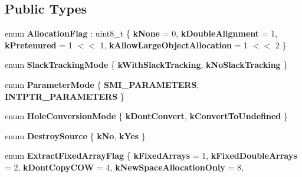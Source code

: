 \subsection*{Public Types}
\begin{DoxyCompactItemize}
\item 
\mbox{\label{classv8_1_1internal_1_1CodeStubAssembler_ae0f494c1a999736b5872756bb674ca27}} 
enum {\bfseries Allocation\+Flag} \+: uint8\+\_\+t \{ {\bfseries k\+None} = 0, 
{\bfseries k\+Double\+Alignment} = 1, 
{\bfseries k\+Pretenured} = 1 $<$$<$ 1, 
{\bfseries k\+Allow\+Large\+Object\+Allocation} = 1 $<$$<$ 2
 \}
\item 
\mbox{\label{classv8_1_1internal_1_1CodeStubAssembler_a9ce2b792c40dc56acca083b259c5ebb3}} 
enum {\bfseries Slack\+Tracking\+Mode} \{ {\bfseries k\+With\+Slack\+Tracking}, 
{\bfseries k\+No\+Slack\+Tracking}
 \}
\item 
\mbox{\label{classv8_1_1internal_1_1CodeStubAssembler_a9e5ad1c566cda424a1313af35b30e5da}} 
enum {\bfseries Parameter\+Mode} \{ {\bfseries S\+M\+I\+\_\+\+P\+A\+R\+A\+M\+E\+T\+E\+RS}, 
{\bfseries I\+N\+T\+P\+T\+R\+\_\+\+P\+A\+R\+A\+M\+E\+T\+E\+RS}
 \}
\item 
\mbox{\label{classv8_1_1internal_1_1CodeStubAssembler_a9ece9235b86364fa8bf797414b12ec97}} 
enum {\bfseries Hole\+Conversion\+Mode} \{ {\bfseries k\+Dont\+Convert}, 
{\bfseries k\+Convert\+To\+Undefined}
 \}
\item 
\mbox{\label{classv8_1_1internal_1_1CodeStubAssembler_a9f23e43260e1a794d9b2c3d0c4a8d92c}} 
enum {\bfseries Destroy\+Source} \{ {\bfseries k\+No}, 
{\bfseries k\+Yes}
 \}
\item 
\mbox{\label{classv8_1_1internal_1_1CodeStubAssembler_a1557f6f70a1964a6a397ed003722c0af}} 
enum {\bfseries Extract\+Fixed\+Array\+Flag} \{ \newline
{\bfseries k\+Fixed\+Arrays} = 1, 
{\bfseries k\+Fixed\+Double\+Arrays} = 2, 
{\bfseries k\+Dont\+Copy\+C\+OW} = 4, 
{\bfseries k\+New\+Space\+Allocation\+Only} = 8, 
\newline

\end{DoxyCompactItemize}
